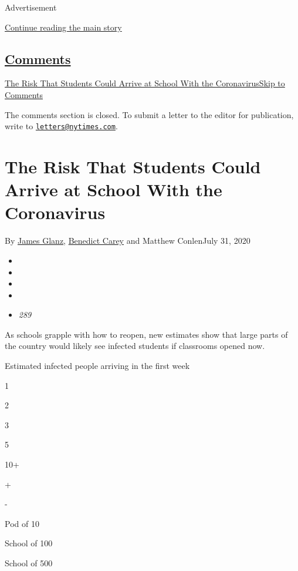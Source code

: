 Advertisement

\protect\hyperlink{after-top}{Continue reading the main story}

\hypertarget{comments}{%
\subsection{\texorpdfstring{\protect\hyperlink{commentsContainer}{Comments}}{Comments}}\label{comments}}

\href{}{The Risk That Students Could Arrive at School With the
Coronavirus}\href{}{Skip to Comments}

The comments section is closed. To submit a letter to the editor for
publication, write to
\href{mailto:letters@nytimes.com}{\nolinkurl{letters@nytimes.com}}.

\hypertarget{the-risk-that-students-could-arrive-at-school-with-the-coronavirus}{%
\section{The Risk That Students Could Arrive at School With the
Coronavirus}\label{the-risk-that-students-could-arrive-at-school-with-the-coronavirus}}

By \href{https://www.nytimes.com/by/james-glanz}{James Glanz},
\href{https://www.nytimes.com/by/benedict-carey}{Benedict Carey} and
Matthew ConlenJuly 31, 2020

\begin{itemize}
\item
\item
\item
\item
\item
  \emph{289}
\end{itemize}

As schools grapple with how to reopen, new estimates show that large
parts of the country would likely see infected students if classrooms
opened now.

Estimated infected people arriving in the first week

1

2

3

5

10+

+

-

Pod of 10

School of 100

School of 500


